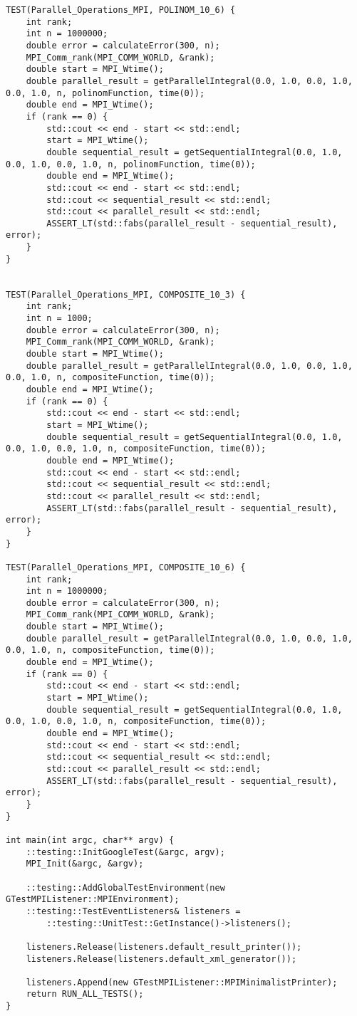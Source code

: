 \documentclass{report}
\begin{document}
\begin{lstlisting}
TEST(Parallel_Operations_MPI, POLINOM_10_6) {
    int rank;
    int n = 1000000;
    double error = calculateError(300, n);
    MPI_Comm_rank(MPI_COMM_WORLD, &rank);
    double start = MPI_Wtime();
    double parallel_result = getParallelIntegral(0.0, 1.0, 0.0, 1.0, 0.0, 1.0, n, polinomFunction, time(0));
    double end = MPI_Wtime();
    if (rank == 0) {
        std::cout << end - start << std::endl;
        start = MPI_Wtime();
        double sequential_result = getSequentialIntegral(0.0, 1.0, 0.0, 1.0, 0.0, 1.0, n, polinomFunction, time(0));
        double end = MPI_Wtime();
        std::cout << end - start << std::endl;
        std::cout << sequential_result << std::endl;
        std::cout << parallel_result << std::endl;
        ASSERT_LT(std::fabs(parallel_result - sequential_result), error);
    }
}


TEST(Parallel_Operations_MPI, COMPOSITE_10_3) {
    int rank;
    int n = 1000;
    double error = calculateError(300, n);
    MPI_Comm_rank(MPI_COMM_WORLD, &rank);
    double start = MPI_Wtime();
    double parallel_result = getParallelIntegral(0.0, 1.0, 0.0, 1.0, 0.0, 1.0, n, compositeFunction, time(0));
    double end = MPI_Wtime();
    if (rank == 0) {
        std::cout << end - start << std::endl;
        start = MPI_Wtime();
        double sequential_result = getSequentialIntegral(0.0, 1.0, 0.0, 1.0, 0.0, 1.0, n, compositeFunction, time(0));
        double end = MPI_Wtime();
        std::cout << end - start << std::endl;
        std::cout << sequential_result << std::endl;
        std::cout << parallel_result << std::endl;
        ASSERT_LT(std::fabs(parallel_result - sequential_result), error);
    }
}

TEST(Parallel_Operations_MPI, COMPOSITE_10_6) {
    int rank;
    int n = 1000000;
    double error = calculateError(300, n);
    MPI_Comm_rank(MPI_COMM_WORLD, &rank);
    double start = MPI_Wtime();
    double parallel_result = getParallelIntegral(0.0, 1.0, 0.0, 1.0, 0.0, 1.0, n, compositeFunction, time(0));
    double end = MPI_Wtime();
    if (rank == 0) {
        std::cout << end - start << std::endl;
        start = MPI_Wtime();
        double sequential_result = getSequentialIntegral(0.0, 1.0, 0.0, 1.0, 0.0, 1.0, n, compositeFunction, time(0));
        double end = MPI_Wtime();
        std::cout << end - start << std::endl;
        std::cout << sequential_result << std::endl;
        std::cout << parallel_result << std::endl;
        ASSERT_LT(std::fabs(parallel_result - sequential_result), error);
    }
}

int main(int argc, char** argv) {
    ::testing::InitGoogleTest(&argc, argv);
    MPI_Init(&argc, &argv);

    ::testing::AddGlobalTestEnvironment(new GTestMPIListener::MPIEnvironment);
    ::testing::TestEventListeners& listeners =
        ::testing::UnitTest::GetInstance()->listeners();

    listeners.Release(listeners.default_result_printer());
    listeners.Release(listeners.default_xml_generator());

    listeners.Append(new GTestMPIListener::MPIMinimalistPrinter);
    return RUN_ALL_TESTS();
}
\end{lstlisting}
\end{document}
